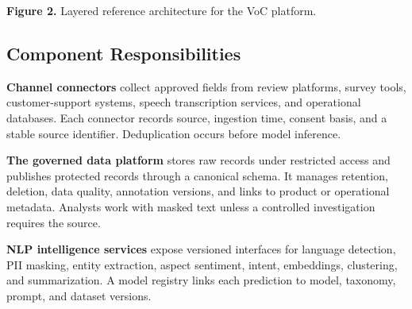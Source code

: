 \documentclass[11pt,a4paper,twoside]{article}
\begin{document}
\begin{center}

\vspace{0.1em}
{\small\textbf{Figure 2.} Layered reference architecture for the VoC platform.}
\end{center}

\subsection{Component Responsibilities}

\textbf{Channel connectors} collect approved fields from review platforms, survey tools, customer-support systems, speech transcription services, and operational databases. Each connector records source, ingestion time, consent basis, and a stable source identifier. Deduplication occurs before model inference.

\textbf{The governed data platform} stores raw records under restricted access and publishes protected records through a canonical schema. It manages retention, deletion, data quality, annotation versions, and links to product or operational metadata. Analysts work with masked text unless a controlled investigation requires the source.

\textbf{NLP intelligence services} expose versioned interfaces for language detection, PII masking, entity extraction, aspect sentiment, intent, embeddings, clustering, and summarization. A model registry links each prediction to model, taxonomy, prompt, and dataset versions.
\end{document}
